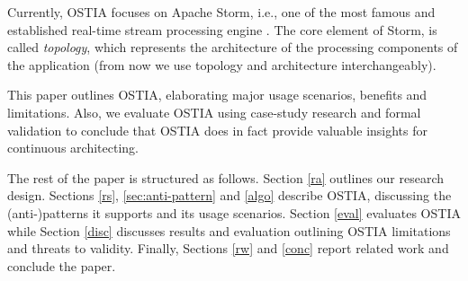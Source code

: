 Currently, OSTIA focuses on Apache Storm, i.e., one of the most famous and established real-time stream processing engine \cite{storm, toshniwal2014storm}. The core element of Storm, is called \emph{topology}, which represents the architecture of the processing components of the application (from now we use topology and architecture interchangeably).

This paper outlines OSTIA, elaborating major usage scenarios, benefits and limitations. Also, we evaluate OSTIA using case-study research and formal validation to conclude that OSTIA does in fact provide valuable insights for continuous architecting.

The rest of the paper is structured as follows. Section \ref{ra} outlines our research design. Sections \ref{rs}, \ref{sec:anti-pattern} and \ref{algo} describe OSTIA, discussing the (anti-)patterns it supports and its usage scenarios. Section \ref{eval} evaluates OSTIA while Section \ref{disc} discusses results and evaluation outlining OSTIA limitations and threats to validity. Finally, Sections \ref{rw} and \ref{conc} report related work and conclude the paper.
